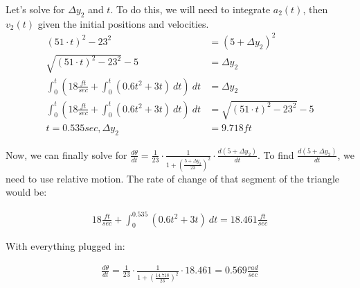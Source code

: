 \documentclass[xcolor={usenames, dvipsnames}]{beamer}
\begin{document}
\begin{frame}

    \begin{figure}[t]
    \end{figure}

    Let's solve for $\Delta y_2$ and $t$. To do this, we will need to integrate $a_2(t)$, 
    then $v_2(t)$ given the initial positions and velocities. 
    \begin{align*}
       (51 \cdot t)^2 -23^2 &=(5+\Delta y_2)^2 \\
       \sqrt{(51 \cdot t)^2 - 23^2} - 5 &= \Delta y_2\\
       \int_{0}^{t} (18\frac{ft}{sec}+\int_{0}^{t} (0.6t^2+3t) \ dt) \ dt &= \Delta y_2 \\
       \int_{0}^{t} (18\frac{ft}{sec}+\int_{0}^{t} (0.6t^2+3t) \ dt) \ dt &= \sqrt{(51 \cdot t)^2 - 23^2} - 5 \\
       t = 0.535 sec, \Delta y_2 &= 9.718 ft
    \end{align*}

\end{frame}

\begin{frame}

    Now, we can finally solve for $\frac{d\theta}{dt} = \frac{1}{23} \cdot \frac{1}{1 + (\frac{5 + \Delta y_{2}}{23})^2} \cdot \frac{d(5 + \Delta y_{2})}{dt}$. 
    To find $\frac{d(5+\Delta y_2)}{dt}$, we need to use relative motion. The rate of change of that segment of the triangle would be:

    \begin{align*}
        18\frac{ft}{sec}+\int_{0}^{0.535}(0.6t^2+3t) \ dt = 18.461 \frac{ft}{sec}
    \end{align*}

    With everything plugged in:

    \begin{align*}
        \frac{d\theta}{dt} = \frac{1}{23} \cdot \frac{1}{1 + (\frac{14.718}{23})^2} \cdot 18.461 = 0.569 \frac{rad}{sec}
    \end{align*}

\end{frame}
\end{document}

